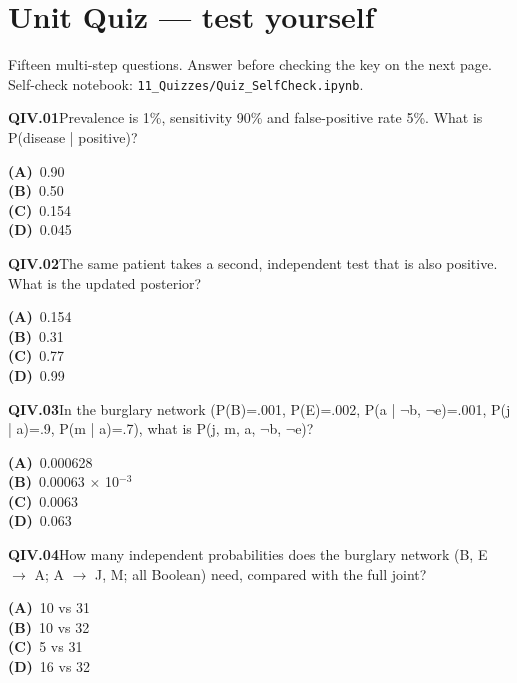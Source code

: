 \section{Unit Quiz --- test yourself}
{\small\color{slate}Fifteen multi-step questions. Answer before checking the key on the next page. Self-check notebook: \texttt{11\_Quizzes/Quiz\_SelfCheck.ipynb}.}\par\medskip
\begin{tcolorbox}[enhanced,breakable,colback=white,colframe=navyL,arc=2mm,boxrule=0.7pt,left=3mm,right=3mm,top=2mm,bottom=2mm]
\textbf{\color{navy}QIV.01}\quad Prevalence is 1\%, sensitivity 90\% and false-positive rate 5\%. What is P(disease | positive)?\hfill{}\par\smallskip
{\small \textbf{\color{navyL}(A)}\ 0.90\\[1pt]\textbf{\color{navyL}(B)}\ 0.50\\[1pt]\textbf{\color{navyL}(C)}\ 0.154\\[1pt]\textbf{\color{navyL}(D)}\ 0.045}
\end{tcolorbox}
\begin{tcolorbox}[enhanced,breakable,colback=white,colframe=navyL,arc=2mm,boxrule=0.7pt,left=3mm,right=3mm,top=2mm,bottom=2mm]
\textbf{\color{navy}QIV.02}\quad The same patient takes a second, independent test that is also positive. What is the updated posterior?\hfill{}\par\smallskip
{\small \textbf{\color{navyL}(A)}\ 0.154\\[1pt]\textbf{\color{navyL}(B)}\ 0.31\\[1pt]\textbf{\color{navyL}(C)}\ 0.77\\[1pt]\textbf{\color{navyL}(D)}\ 0.99}
\end{tcolorbox}
\begin{tcolorbox}[enhanced,breakable,colback=white,colframe=navyL,arc=2mm,boxrule=0.7pt,left=3mm,right=3mm,top=2mm,bottom=2mm]
\textbf{\color{navy}QIV.03}\quad In the burglary network (P(B)=.001, P(E)=.002, P(a | $\neg$b, $\neg$e)=.001, P(j | a)=.9, P(m | a)=.7), what is P(j, m, a, $\neg$b, $\neg$e)?\hfill{}\par\smallskip
{\small \textbf{\color{navyL}(A)}\ 0.000628\\[1pt]\textbf{\color{navyL}(B)}\ 0.00063 $\times$ 10$^{-3}$\\[1pt]\textbf{\color{navyL}(C)}\ 0.0063\\[1pt]\textbf{\color{navyL}(D)}\ 0.063}
\end{tcolorbox}
\begin{tcolorbox}[enhanced,breakable,colback=white,colframe=navyL,arc=2mm,boxrule=0.7pt,left=3mm,right=3mm,top=2mm,bottom=2mm]
\textbf{\color{navy}QIV.04}\quad How many independent probabilities does the burglary network (B, E $\to$ A; A $\to$ J, M; all Boolean) need, compared with the full joint?\hfill{}\par\smallskip
{\small \textbf{\color{navyL}(A)}\ 10 vs 31\\[1pt]\textbf{\color{navyL}(B)}\ 10 vs 32\\[1pt]\textbf{\color{navyL}(C)}\ 5 vs 31\\[1pt]\textbf{\color{navyL}(D)}\ 16 vs 32}
\end{tcolorbox}
